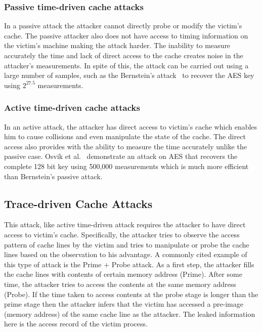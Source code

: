 \documentclass[onecolumn]{IEEEtran}
\begin{document}
\subsubsection{Passive time-driven cache attacks}

In a passive attack the attacker cannot directly probe or modify the
victim's cache.  The passive attacker also does not have access to
timing information on the victim's machine making the attack harder.
The inability to measure accurately the time and lack of direct access
to the cache creates noise in the attacker's measurements.  In spite
of this, the attack can be carried out using a large number of
samples, such as the Bernstein's attack~\cite{bernstein2005cache} to
recover the AES key using $2^{27.5}$ measurements.
 
\subsubsection{Active time-driven cache attacks}

In an active attack, the attacker has direct access to victim's cache
which enables him to cause collisions and even manipulate the state of
the cache.  The direct access also provides with the ability to
measure the time accurately unlike the passive case.  Osvik et
al.~\cite{osvik2006cache} demonstrate an attack on AES that recovers
the complete 128 bit key using 500,000 measurements which is much more
efficient than Bernstein's passive attack.

\subsection{Trace-driven Cache Attacks}

This attack, like active time-driven attack requires the attacker to
have direct access to victim's cache.  Specifically, the attacker
tries to observe the access pattern of cache lines by the victim and
tries to manipulate or probe the cache lines based on the observation
to his advantage.  A commonly cited example of this type of attack is
the Prime + Probe attack.  As a first step, the attacker fills the
cache lines with contents of certain memory address (Prime).  After
some time, the attacker tries to access the contents at the same
memory address (Probe).  If the time taken to access contents at the
probe stage is longer than the prime stage then the attacker infers
that the victim has accessed a pre-image (memory address) of the same
cache line as the attacker.  The leaked information here is the access
record of the victim process.
\end{document}

